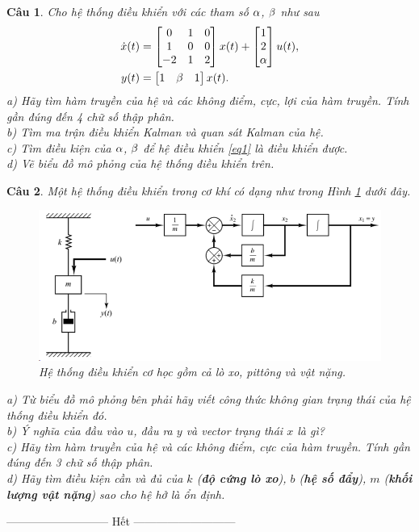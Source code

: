 \documentclass[11pt]{article}
\newtheorem{bt}{Câu}
\begin{document}
\begin{bt}
	Cho hệ thống điều khiển với các tham số $\alpha$, $\beta$ như sau
	\begin{align}\label{eq1}
		\dot{x}(t) &= \begin{bmatrix} 0 & 1 & 0 \\ 1 & 0 & 0 \\ -2 & 1 & 2 \end{bmatrix} x(t) + \begin{bmatrix} 1 \\ 2 \\ \alpha \end{bmatrix} u(t), \\
		y(t) &= \begin{bmatrix} 1 & \beta & 1 \end{bmatrix} x(t). 
	\end{align}
	a) Hãy tìm hàm truyền của hệ và các không điểm, cực, lợi của hàm truyền. Tính gần đúng đến 4 chữ số thập phân. \\	
	b) Tìm ma trận điều khiển Kalman và quan sát Kalman của hệ. \\
	c) Tìm điều kiện của $\alpha$, $\beta$ để hệ điều khiển \eqref{eq1} là điều khiển được. \\
	d) Vẽ biểu đồ mô phỏng của hệ thống điều khiển trên.
\end{bt}


\begin{bt}\label{Câu 1}
	Một hệ thống điều khiển trong cơ khí có dạng như trong Hình \ref{fig:mechanicalsystem} dưới đây. 
	
	\begin{figure}[!h]
		\centering
		\includegraphics[width=0.7\linewidth]{Mechanical_System}
		\caption[Hệ thống điều khiển cơ học]{Hệ thống điều khiển cơ học gồm cả lò xo, pittông và vật nặng.}
		\label{fig:mechanicalsystem}
	\end{figure}
	
	a) Từ biểu đồ mô phỏng bên phải hãy viết công thức không gian trạng thái của hệ thống điều khiển đó. \\
	b) Ý nghĩa của đầu vào $u$, đầu ra $y$ và vector trạng thái $x$ là gì? \\
	c) Hãy tìm hàm truyền của hệ và các không điểm, cực của hàm truyền. Tính gần đúng đến 3 chữ số thập phân. \\
	d) Hãy tìm điều kiện cần và đủ của $k$ (\textbf{độ cứng lò xo}), $b$ (\textbf{hệ số đẩy}), $m$ (\textbf{khối lượng vật nặng}) sao cho hệ hở là ổn định.
\end{bt}


\begin{center}
	--------------------------- Hết ---------------------------
\end{center}
\end{document}
